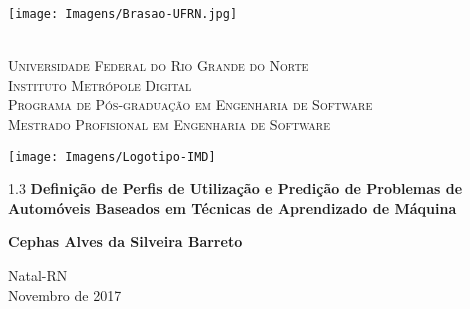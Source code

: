 
\begin{titlingpage}
	\begin{center}
		\begin{minipage}{2.2cm}
			\begin{center}
				\texttt{[image: Imagens/Brasao-UFRN.jpg]}
			\end{center}
		\end{minipage}
		\begin{minipage}{10.15cm}
			\begin{center}
					{\small \ \\
                       \textsc{Universidade Federal do Rio Grande do Norte}		   			\\
							  \textsc{Instituto Metrópole Digital}					\\
							  \textsc{Programa de Pós-graduação em Engenharia de Software}	\\
                       \textsc{Mestrado Profisional em Engenharia de Software}}   				\\
			\end{center}
		\end{minipage}
		\begin{minipage}{2.2cm}
			\begin{center}
				\texttt{[image: Imagens/Logotipo-IMD]}
			\end{center}
		\end{minipage}
			
		\vspace{6cm}
						
		{\setlength{\baselineskip}%
		{1.3\baselineskip}
		{\LARGE \textbf{Definição de Perfis de Utilização e Predição de Problemas de Automóveis Baseados em Técnicas de Aprendizado de Máquina}}\par}
			
		\vspace{3cm}
			
		{\large \textbf{Cephas Alves da Silveira Barreto}}
						
		\vspace{6cm}
		
		Natal-RN\\Novembro de 2017
	\end{center}
\end{titlingpage}
